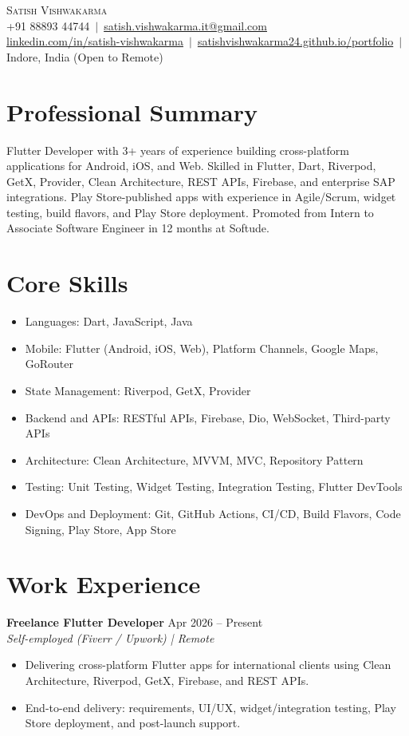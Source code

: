 \documentclass[a4paper,10pt]{article}
\newcommand{\resumeItem}[1]{\item\small{#1\vspace{-1pt}}}
\begin{document}
\begin{center}
  {\Huge \scshape Satish Vishwakarma} \\[2pt]
  +91 88893 44744 \,$|$\,
  \href{mailto:satish.vishwakarma.it@gmail.com}{satish.vishwakarma.it@gmail.com} \\[2pt]
  \href{https://www.linkedin.com/in/satish-vishwakarma}{linkedin.com/in/satish-vishwakarma} \,$|$\,
  \href{https://satishvishwakarma24.github.io/portfolio/}{satishvishwakarma24.github.io/portfolio} \,$|$\,
  Indore, India (Open to Remote)
\end{center}

\section{Professional Summary}
Flutter Developer with 3+ years of experience building cross-platform applications for Android, iOS, and Web. Skilled in Flutter, Dart, Riverpod, GetX, Provider, Clean Architecture, REST APIs, Firebase, and enterprise SAP integrations. Play Store-published apps with experience in Agile/Scrum, widget testing, build flavors, and Play Store deployment. Promoted from Intern to Associate Software Engineer in 12 months at Softude.

\section{Core Skills}
\begin{itemize}[leftmargin=0.15in, label={\textbullet}, itemsep=0pt]
  \resumeItem{Languages: Dart, JavaScript, Java}
  \resumeItem{Mobile: Flutter (Android, iOS, Web), Platform Channels, Google Maps, GoRouter}
  \resumeItem{State Management: Riverpod, GetX, Provider}
  \resumeItem{Backend and APIs: RESTful APIs, Firebase, Dio, WebSocket, Third-party APIs}
  \resumeItem{Architecture: Clean Architecture, MVVM, MVC, Repository Pattern}
  \resumeItem{Testing: Unit Testing, Widget Testing, Integration Testing, Flutter DevTools}
  \resumeItem{DevOps and Deployment: Git, GitHub Actions, CI/CD, Build Flavors, Code Signing, Play Store, App Store}
\end{itemize}

\section{Work Experience}

\textbf{Freelance Flutter Developer} \hfill Apr 2026 -- Present \\
\textit{Self-employed (Fiverr / Upwork) | Remote}
\begin{itemize}[leftmargin=0.15in, label={\textbullet}, itemsep=0pt]
  \resumeItem{Delivering cross-platform Flutter apps for international clients using Clean Architecture, Riverpod, GetX, Firebase, and REST APIs.}
  \resumeItem{End-to-end delivery: requirements, UI/UX, widget/integration testing, Play Store deployment, and post-launch support.}
\end{itemize}
\end{document}
